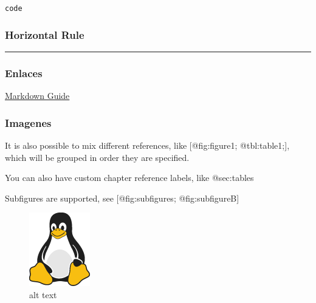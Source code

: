 \texttt{code}

\hypertarget{horizontal-rule}{%
\subsubsection{Horizontal Rule}\label{horizontal-rule}}

\begin{center}\rule{0.5\linewidth}{0.5pt}\end{center}

\hypertarget{enlaces}{%
\subsubsection{Enlaces}\label{enlaces}}

\href{https://www.markdownguide.org}{Markdown Guide}

\hypertarget{imagenes}{%
\subsubsection{Imagenes}\label{imagenes}}

It is also possible to mix different references, like {[}@fig:figure1;
@tbl:table1;{]}, which will be grouped in order they are specified.

You can also have custom chapter reference labels, like @sec:tables

Subfigures are supported, see {[}@fig:subfigures; @fig:subfigureB{]}

\begin{figure}
\hypertarget{fig:figure1}{%
\centering
\includegraphics{img/tux.png}
\caption{alt text}\label{fig:figure1}
}
\end{figure}

